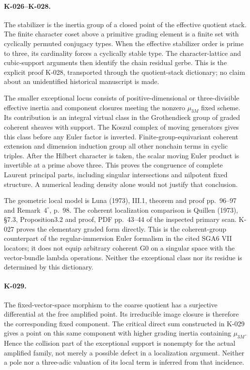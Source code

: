 \paragraph{K-026--K-028.}
The stabilizer is the inertia group of a closed point of the effective
quotient stack. The finite character coset above a primitive grading
element is a finite set with cyclically permuted conjugacy types.
When the effective stabilizer order is prime to three, its cardinality
forces a cyclically stable type. The character-lattice and cubic-support
arguments then identify the chain residual gerbe. This is the explicit
proof K-028, transported through the quotient-stack dictionary; no
claim about an unidentified historical manuscript is made.

The smaller exceptional locus consists of positive-dimensional or
three-divisible effective inertia and component closures meeting the
nonzero $\mu_{3M}$ fixed scheme. Its contribution is an integral virtual
class in the Grothendieck group of graded coherent sheaves with support.
The Koszul complex of moving generators gives this class before any
Euler factor is inverted. Finite-group-equivariant coherent extension
and dimension induction group all other nonchain terms in cyclic triples.
After the Hilbert character is taken, the scalar moving Euler product
is invertible at a prime above three. This proves the congruence of
complete Laurent principal parts, including singular intersections and
nilpotent fixed structure. A numerical leading density alone would not
justify that conclusion.

The geometric local model is Luna (1973), III.1, theorem and proof
pp.~96--97 and Remark~$4^\circ$, p.~98. The coherent localization
comparison is Quillen (1973), \S7.3, Proposition3.2 and proof,
PDF pp.~43--44 of the inspected primary scan. K-027 proves the elementary
graded form directly. This is the coherent-group counterpart of the
regular-immersion Euler formalism in the cited SGA6 VII locators; it
does not equip arbitrary coherent G0 on a singular space with the
vector-bundle lambda operations. Neither the exceptional class nor its
residue is determined by this dictionary.

\paragraph{K-029.}
The fixed-vector-space morphism to the coarse quotient has a surjective
differential at the free amplified point. Its irreducible image closure
is therefore the corresponding fixed component. The critical direct sum
constructed in K-029 gives a point on this same component with higher
grading inertia containing $\mu_{3M}$. Hence the collision part of the
exceptional support is nonempty for the actual amplified family, not
merely a possible defect in a localization argument. Neither a pole nor
a three-adic valuation of its local term is inferred from that incidence.

